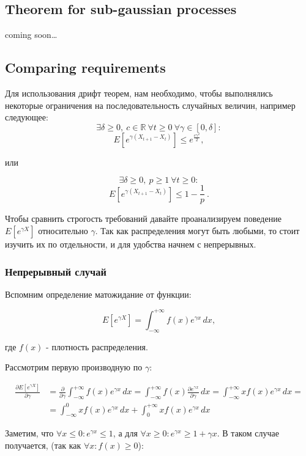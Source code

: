 \documentclass[12pt, a4paper]{article}
\theoremstyle{remark}
\newcommand{\cm}{coming soon\dots}
\begin{document}
\subsection{Theorem for sub-gaussian processes}
\cm
\subsection{Comparing requirements}
Для использования дрифт теорем, нам необходимо, чтобы выполнялись некоторые ограничения на последовательность случайных величин, например следующее:
$$
\exists \delta \geq 0,\ c \in \mathbb{R} \ \forall  t \geq 0 \ \forall \gamma \in [0, \delta] : $$$$
E[e^{\gamma (X_{t + 1} - X_{t})}] \leq e^{\frac{c \gamma^2}{2}},$$

или

$$\exists \delta \geq 0,\ p \geq 1 \ \forall t \geq 0 : $$$$
E[e^{\gamma (X_{t + 1} - X_{t})}] \leq 1 - \frac{1}{p}\ .$$

Чтобы сравнить строгость требований давайте проанализируем поведение $E[e^{\gamma X}]$ относительно $\gamma$. Так как распределения могут быть любыми, то стоит изучить их по отдельности, и для удобства начнем с непрерывных. 

\subsubsection*{Непрерывный случай}

Вспомним определение матожидание от функции:

\[
E[e^{\gamma X}] = \int_{-\infty}^{+\infty} f(x) e^{\gamma x} \,dx,    
\]

где $f(x)$ - плотность распределения.

\hfill

Рассмотрим первую производную по $\gamma$:

\begin{align*}
\frac{\partial E[e^{\gamma X}]}{\partial \gamma} &= \frac{\partial}{\partial \gamma} \int_{-\infty}^{+\infty} f(x) e^{\gamma x} \, dx = \int_{-\infty}^{+\infty} f(x) \frac{\partial e^{\gamma x}}{\partial \gamma} \, dx = \int_{-\infty}^{+\infty} x f(x) e^{\gamma x} \, dx = \\
&= \int_{-\infty}^{0} x f(x) e^{\gamma x} \, dx + \int_{0}^{+\infty} x f(x) e^{\gamma x} \, dx
\end{align*}

Заметим, что $\forall x \leq 0 : e^{\gamma x} \leq 1$, а для $\forall x \geq 0 : e^{\gamma x} \geq 1 + \gamma x$. В таком случае получается, (так как $\forall x : f(x) \geq 0$): 
\end{document}
